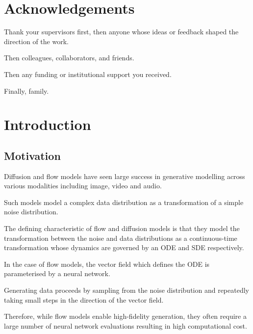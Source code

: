 \documentclass[12pt,a4paper]{report}
\begin{document}
\clearpage


\chapter*{Acknowledgements}
\thispagestyle{empty}

Thank your supervisors first, then anyone whose ideas or feedback shaped
the direction of the work.

Then colleagues, collaborators, and friends.

Then any funding or institutional support you received.

Finally, family.

\clearpage


\tableofcontents
\clearpage

\listoffigures
\clearpage



\clearpage
{}
\setcounter{page}{1}

\chapter{Introduction}                 
\section{Motivation}
Diffusion and flow models have seen large success in generative modelling across various modalities including image, video and audio.

Such models model a complex data distribution as a transformation of a simple noise distribution. 

The defining characteristic of flow and diffusion models is that they model the transformation between the noise and data distributions as a continuous-time transformation whose dynamics are governed by an ODE and SDE respectively. 

In the case of flow models, the vector field which defines the ODE is parameterised by a neural network. 

Generating data proceeds by sampling from the noise distribution and repeatedly taking small steps in the direction of the vector field. 

Therefore, while flow models enable high-fidelity generation, they often require a large number of neural network evaluations resulting in high computational cost. 
\end{document}
